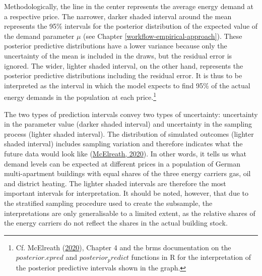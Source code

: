\documentclass[12pt,twoside]{reedthesis}
\begin{document}
Methodologically, the line in the center represents the average energy demand at a respective price. The narrower, darker shaded interval around the mean represents the 95\% intervals for the posterior distribution of the expected value of the demand parameter \(\mu\) (see Chapter \ref{workflow-empirical-approach}). These posterior predictive distributions have a lower variance because only the uncertainty of the mean is included in the draws, but the residual error is ignored. The wider, lighter shaded interval, on the other hand, represents the posterior predictive distributions including the residual error. It is thus to be interpreted as the interval in which the model expects to find 95\% of the actual energy demands in the population at each price.\footnote{Cf. McElreath (\protect\hyperlink{ref-mcelreath20}{2020}), Chapter 4 and the brms documentation on the \(posterior.epred\) and \(posterior_predict\) functions in R for the interpretation of the posterior predictive intervals shown in the graph.}

The two types of prediction intervals convey two types of uncertainty: uncertainty in the parameter value (darker shaded interval) and uncertainty in the sampling process (lighter shaded interval). The distribution of simulated outcomes (lighter shaded interval) includes sampling variation and therefore indicates what the future data would look like (\protect\hyperlink{ref-mcelreath20}{McElreath, 2020}). In other words, it tells us what demand levels can be expected at different prices in a population of German multi-apartment buildings with equal shares of the three energy carriers gas, oil and district heating. The lighter shaded intervals are therefore the most important intervals for interpretation. It should be noted, however, that due to the stratified sampling procedure used to create the subsample, the interpretations are only generalisable to a limited extent, as the relative shares of the energy carriers do not reflect the shares in the actual building stock.
\end{document}
